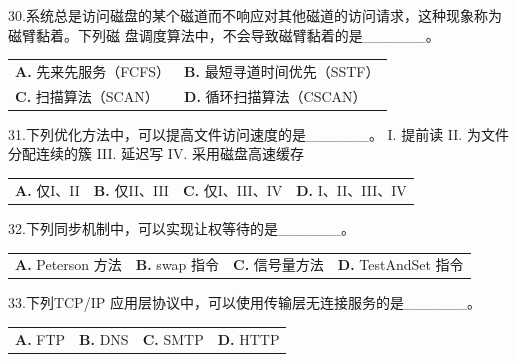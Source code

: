 \documentclass[UTF8,11pt]{ctexart}
\begin{document}
30.系统总是访问磁盘的某个磁道而不响应对其他磁道的访问请求，这种现象称为磁臂黏着。下列磁 盘调度算法中，不会导致磁臂黏着的是\_\_\_\_\_\_。


\begin{center}\begin{tabular}{>{\raggedright\arraybackslash}p{\dimexpr(\linewidth-4\tabcolsep)/2\relax}>{\raggedright\arraybackslash}p{\dimexpr(\linewidth-4\tabcolsep)/2\relax}}
\textbf{A.} 先来先服务（FCFS） & \textbf{B.} 最短寻道时间优先（SSTF）\\[.35em]
\textbf{C.} 扫描算法（SCAN） & \textbf{D.} 循环扫描算法（CSCAN）\\[.35em]\end{tabular}\end{center}

31.下列优化方法中，可以提高文件访问速度的是\_\_\_\_\_\_。 I. 提前读 II. 为文件分配连续的簇 III. 延迟写 IV. 采用磁盘高速缓存


\begin{center}\begin{tabular}{>{\raggedright\arraybackslash}p{\dimexpr(\linewidth-8\tabcolsep)/4\relax}>{\raggedright\arraybackslash}p{\dimexpr(\linewidth-8\tabcolsep)/4\relax}>{\raggedright\arraybackslash}p{\dimexpr(\linewidth-8\tabcolsep)/4\relax}>{\raggedright\arraybackslash}p{\dimexpr(\linewidth-8\tabcolsep)/4\relax}}
\textbf{A.} 仅I、II & \textbf{B.} 仅II、III & \textbf{C.} 仅I、III、IV & \textbf{D.} I、II、III、IV\\[.35em]\end{tabular}\end{center}

32.下列同步机制中，可以实现让权等待的是\_\_\_\_\_\_。


\begin{center}\begin{tabular}{>{\raggedright\arraybackslash}p{\dimexpr(\linewidth-8\tabcolsep)/4\relax}>{\raggedright\arraybackslash}p{\dimexpr(\linewidth-8\tabcolsep)/4\relax}>{\raggedright\arraybackslash}p{\dimexpr(\linewidth-8\tabcolsep)/4\relax}>{\raggedright\arraybackslash}p{\dimexpr(\linewidth-8\tabcolsep)/4\relax}}
\textbf{A.} Peterson 方法 & \textbf{B.} swap 指令 & \textbf{C.} 信号量方法 & \textbf{D.} TestAndSet 指令\\[.35em]\end{tabular}\end{center}

33.下列TCP/IP 应用层协议中，可以使用传输层无连接服务的是\_\_\_\_\_\_。


\begin{center}\begin{tabular}{>{\raggedright\arraybackslash}p{\dimexpr(\linewidth-8\tabcolsep)/4\relax}>{\raggedright\arraybackslash}p{\dimexpr(\linewidth-8\tabcolsep)/4\relax}>{\raggedright\arraybackslash}p{\dimexpr(\linewidth-8\tabcolsep)/4\relax}>{\raggedright\arraybackslash}p{\dimexpr(\linewidth-8\tabcolsep)/4\relax}}
\textbf{A.} FTP & \textbf{B.} DNS & \textbf{C.} SMTP & \textbf{D.} HTTP\\[.35em]\end{tabular}\end{center}
\end{document}
